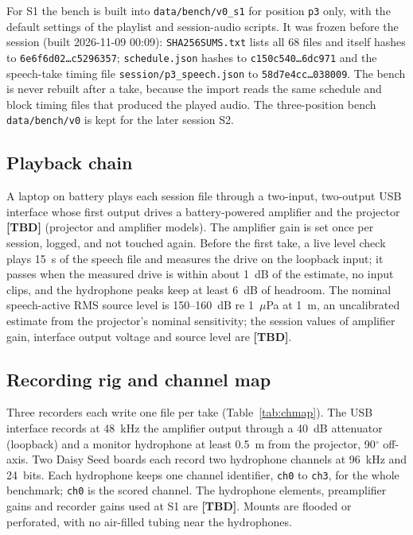 \documentclass[conference]{IEEEtran}
\newcommand{\tbd}{\textbf{[TBD]}}
\begin{document}
For S1 the bench is built into \texttt{data/bench/v0\_s1} for position \texttt{p3} only, with the
default settings of the playlist and session-audio scripts. It was frozen before the session (built
2026-11-09 00:09): \texttt{SHA256SUMS.txt} lists all 68 files and itself hashes to
\texttt{6e6f6d02\ldots c5296357}; \texttt{schedule.json} hashes to \texttt{c150c540\ldots 6dc971} and
the speech-take timing file \texttt{session/p3\_speech.json} to \texttt{58d7e4cc\ldots 038009}. The
bench is never rebuilt after a take, because the import reads the same schedule and block timing files
that produced the played audio. The three-position bench \texttt{data/bench/v0} is kept for the
later session S2.

\subsection{Playback chain}
\label{sec:playback}
A laptop on battery plays each session file through a two-input, two-output USB interface whose first
output drives a battery-powered amplifier and the projector \tbd{} (projector and amplifier models). The
amplifier gain is set once per session, logged, and not touched again. Before the first take, a live
level check plays 15~s of the speech file and measures the drive on the loopback input; it passes when
the measured drive is within about 1~dB of the estimate, no input clips, and the hydrophone peaks keep
at least 6~dB of headroom. The nominal speech-active RMS source level is 150--160~dB re
1~$\mu$Pa at 1~m, an uncalibrated estimate from the projector's nominal sensitivity; the session values
of amplifier gain, interface output voltage and source level are \tbd.

\subsection{Recording rig and channel map}
\label{sec:rig}
Three recorders each write one file per take (Table~\ref{tab:chmap}). The USB interface records at
48~kHz the amplifier output through a 40~dB attenuator (loopback) and a monitor hydrophone at least
0.5~m from the projector, 90$^\circ$ off-axis. Two Daisy Seed boards each record two hydrophone
channels at 96~kHz and 24~bits. Each hydrophone keeps one channel identifier, \texttt{ch0} to
\texttt{ch3}, for the whole benchmark; \texttt{ch0} is the scored channel. The hydrophone elements,
preamplifier gains and recorder gains used at S1 are \tbd. Mounts are flooded or perforated, with no
air-filled tubing near the hydrophones.
\end{document}
